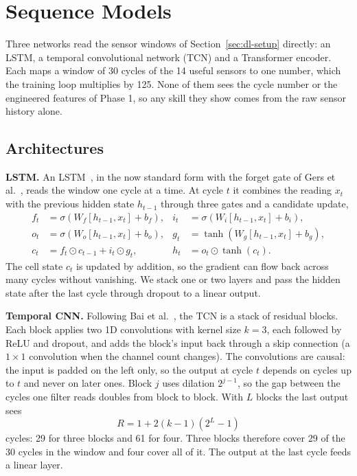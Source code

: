 \section{Sequence Models}
\label{sec:dl-models}

Three networks read the sensor windows of Section~\ref{sec:dl-setup}
directly: an LSTM, a temporal convolutional network (TCN) and a Transformer
encoder. Each maps a window of 30 cycles of the 14 useful sensors to one
number, which the training loop multiplies by 125. None of them sees the
cycle number or the engineered features of Phase 1, so any skill they show
comes from the raw sensor history alone.

\subsection{Architectures}
\textbf{LSTM.} An LSTM~\cite{hochreiter1997lstm}, in the now standard form
with the forget gate of Gers et al.~\cite{gers2000forget}, reads the window
one cycle at a time. At cycle $t$ it combines the reading $x_t$ with the previous
hidden state $h_{t-1}$ through three gates and a candidate update,
\begin{align*}
f_t &= \sigma(W_f[h_{t-1}, x_t] + b_f), &
i_t &= \sigma(W_i[h_{t-1}, x_t] + b_i), \\
o_t &= \sigma(W_o[h_{t-1}, x_t] + b_o), &
g_t &= \tanh(W_g[h_{t-1}, x_t] + b_g), \\
c_t &= f_t \odot c_{t-1} + i_t \odot g_t, &
h_t &= o_t \odot \tanh(c_t).
\end{align*}
The cell state $c_t$ is updated by addition, so the gradient can flow back
across many cycles without vanishing. We stack one or two layers and pass
the hidden state after the last cycle through dropout to a linear output.

\textbf{Temporal CNN.} Following Bai et al.~\cite{bai2018tcn}, the TCN is a
stack of residual blocks. Each block applies two 1D convolutions with
kernel size $k = 3$, each followed by ReLU and dropout, and adds the block's
input back through a skip connection (a $1 \times 1$ convolution when the
channel count changes). The convolutions are causal: the input is padded on
the left only, so the output at cycle $t$ depends on cycles up to $t$ and
never on later ones. Block $j$ uses dilation $2^{j-1}$, so the gap between
the cycles one filter reads doubles from block to block. With $L$ blocks
the last output sees
\[
  R = 1 + 2(k-1)(2^{L}-1)
\]
cycles: 29 for three blocks and 61 for four. Three blocks therefore cover
29 of the 30 cycles in the window and four cover all of it. The output at
the last cycle feeds a linear layer.

